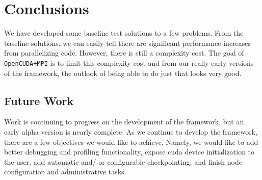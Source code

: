 \section{Conclusions}

We have developed some baseline test solutions to a few problems. From the
baseline solutions, we can easily tell there are significant performance
increases from parallelizing code. However, there is still a complexity cost.
The goal of \texttt{OpenCUDA+MPI} is to limit this complexity cost and from our
really early versions of the framework, the outlook of being able to do just
that looks very good.

\subsection{Future Work}

Work is continuing to progress on the development of the framework, but an
early alpha version is nearly complete. As we continue to develop the
framework, there are a few objectives we would like to achieve. Namely, we
would like to add better debugging and profiling functionality, expose
\gls{cuda} device initialization to the user, add automatic and/ or
configurable checkpointing, and finish node configuration and administrative
tasks.
